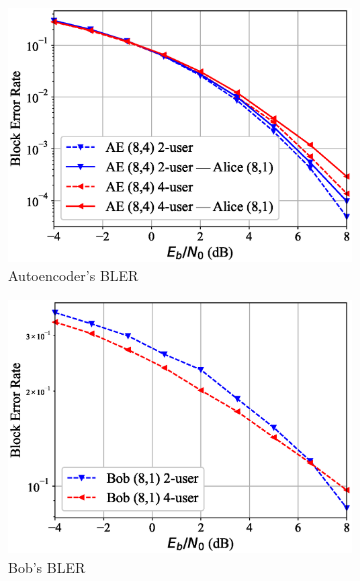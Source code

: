 \begin{figure}[tp!]
	\begin{subfigure}{0.3\textwidth}
		\includegraphics[width=\linewidth]{figs/multi_covert_autoencoder_bler_awgn}
		\caption{Autoencoder's BLER}
		\label{fig:multi_awgn_resutls_ae}
	\end{subfigure}
	\hspace*{\fill}
	\begin{subfigure}{0.3\textwidth}
		\includegraphics[width=\linewidth]{figs/multi_bob_bler_awgn}
		\caption{Bob's BLER}	
		\label{fig:multi_awgn_resutls_bob}
	\end{subfigure}
	\hspace*{\fill}
	\begin{subfigure}{0.3\textwidth}

\end{subfigure}
\end{figure}
